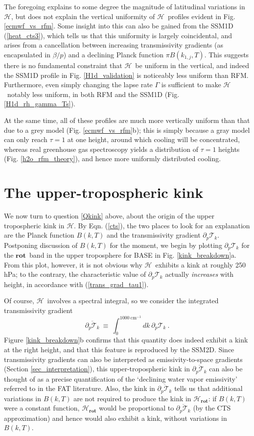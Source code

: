 \documentclass{ametsoc}
\newcommand{\beqn}{\begin{equation}}
\newcommand{\eeqn}{\end{equation}}
\newcommand{\eqnref}[1]{(\ref{#1})}
\newcommand{\cminverse}{\ensuremath{\mathrm{cm^{-1}}}}
\newcommand{\ppp}{\ensuremath{\partial_p}}
\newcommand{\trans}{\ensuremath{\mathcal{T}}}
\newcommand{\ch}{\ensuremath{\mathcal{H}}}
\newcommand{\konej}{\ensuremath{k_{1,j}}}
\newcommand{\rot}{\ensuremath{\textbf{rot}}}
\begin{document}
The foregoing explains to some degree the magnitude of latitudinal variations in \ch, but does not explain the vertical uniformity of  \ch\ profiles evident in Fig. \ref{ecmwf_vs_rfm}. Some insight into this can also be gained from the SSM1D \eqnref{heat_cts3}, which tells us that this uniformity is largely coincidental, and arises from a cancellation between increasing  transmissivity gradients (as encapsulated in $\beta/p$) and a declining Planck function $\pi B(\konej,T)$. This suggests there is no fundamental constraint that \ch\ be uniform in the vertical, and indeed the SSM1D profile in Fig. \ref{H1d_validation} is noticeably less uniform than RFM. Furthermore, even simply changing the lapse rate $\Gamma$ is sufficient to make \ch\ notably less uniform, in both RFM and the SSM1D (Fig. \ref{H1d_rh_gamma_Ts}). 

  At the same time, all of these profiles are much more vertically uniform than that due to a grey model (Fig. \ref{ecmwf_vs_rfm}b); this is simply because a gray model can only reach $\tau=1$ at one height, around which cooling will be concentrated, whereas real greenhouse gas spectroscopy yields a distribution of $\tau=1$ heights (Fig. \ref{h2o_rfm_theory}), and hence more uniformly distributed cooling. 
  
\section{The upper-tropospheric kink} \label{sec_kink}
  We now turn to question \ref{Qkink} above, about the origin of the upper tropospheric kink in \ch. By Eqn. \eqnref{cts}, the two places to look for an explanation are the Planck function $B(k,T)$ and  the transmissivity gradient $\ppp \trans_k$. Postponing discussion of $B(k,T)$ for the moment, we begin by  plotting $\ppp \trans_k$ for the \rot\ band in the upper troposphere for BASE in Fig. \ref{kink_breakdown}a. From this plot, however, it is not obvious why \ch\ exhibits a kink at roughly 250 hPa; to the contrary,  the characteristic value of $\ppp \trans_k$ actually \emph{increases} with height, in accordance with \eqnref{trans_grad_tau1}. 
  
Of course, \ch\ involves a spectral integral, so we consider the integrated transmissivity gradient
\beqn
	\overline{\ppp \trans_k} \ \equiv \  \int_0^{1000\ \cminverse} dk\  \ppp \trans_k \ .
	\label{int_trans}
\eeqn 
 Figure \ref{kink_breakdown}b confirms that this quantity does indeed exhibit a kink at the right height, and that this feature is reproduced by the SSM2D. Since transmissivity gradients can also be interpreted as emissivity-to-space gradients (Section \ref{sec_interpretation}), this upper-tropospheric kink in $\overline{\ppp \trans_k}$  can also be thought of as a precise quantification of the `declining water vapor emissivity' referred to in the FAT literature. Also, the kink in $\overline{\ppp \trans_k}$ tells us that additional variations in $B(k,T)$ are not required to produce the kink in $\ch_{\rot}$:  if $B(k,T)$ were a constant function, $\ch_{\rot}$ would  be proportional to $\overline{\ppp \trans_k}$ (by the CTS approximation) and hence would also exhibit a kink, without variations in $B(k,T)$.  
\end{document}
